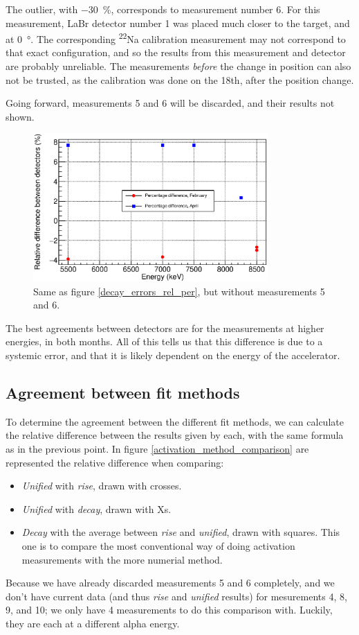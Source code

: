 \documentclass[a4paper,12pt]{report}
\newcommand{\Na}{\textsuperscript{22}Na }
\begin{document}
The outlier, with \qty{-30}{\percent}, corresponds to measurement number 6.
For this measurement, LaBr detector number 1 was placed much closer to the target, and at \qty{0}{\degree}.
The corresponding \Na calibration measurement may not correspond to that exact configuration, and so the results from this measurement and detector are probably unreliable.
The measurements \emph{before} the change in position can also not be trusted, as the calibration was done on the 18th, after the position change.

Going forward, measurements 5 and 6 will be discarded, and their results not shown.
\\

\begin{figure}[H]
	\centering
	\includegraphics[width=0.80\textwidth]{decay_errors_rel_per_fixed.eps}
	\caption{Same as figure \ref{decay_errors_rel_per}, but without measurements 5 and 6.}
	\label{decay_errors_rel_per_fixed}
\end{figure}

The best agreements between detectors are for the measurements at higher energies, in both months.
All of this tells us that this difference is due to a systemic error, and that it is likely dependent on the energy of the accelerator.

\subsection{Agreement between fit methods}
To determine the agreement between the different fit methods, we can calculate the relative difference between the results given by each, with the same formula as in the previous point.
In figure \ref{activation_method_comparison} are represented the relative difference when comparing:
\begin{itemize}
	\item \textit{Unified} with \textit{rise}, drawn with crosses.
	\item \textit{Unified} with \textit{decay}, drawn with Xs.
	\item \textit{Decay} with the average between \textit{rise} and \textit{unified}, drawn with squares.
		This one is to compare the most conventional way of doing activation measurements with the more numerial method.
\end{itemize}
Because we have already discarded measurements 5 and 6 completely, and we don't have current data (and thus \textit{rise} and \textit{unified} results) for mesurements 4, 8, 9, and 10; we only have 4 measurements to do this comparison with.
Luckily, they are each at a different alpha energy.
\end{document}
